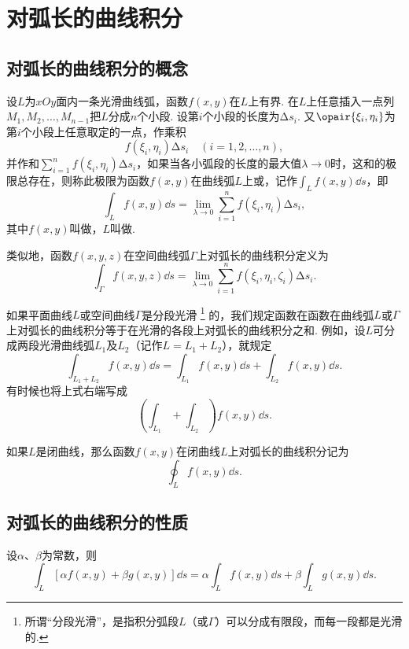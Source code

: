 \section{对弧长的曲线积分}
\subsection{对弧长的曲线积分的概念}
\begin{definition}
设\(L\)为\(xOy\)面内一条光滑曲线弧，函数\(f(x,y)\)在\(L\)上有界.
在\(L\)上任意插入一点列\(M_1,M_2,\dotsc,M_{n-1}\)把\(L\)分成\(n\)个小段.
设第\(i\)个小段的长度为\(\increment s_i\).
又\(\opair{\xi_i,\eta_i}\)为第\(i\)个小段上任意取定的一点，作乘积\[
f(\xi_i,\eta_i) \increment s_i \quad(i=1,2,\dotsc,n),
\]并作和\(\sum\limits_{i=1}^n f(\xi_i,\eta_i) \increment s_i\)，如果当各小弧段的长度的最大值\(\lambda\to0\)时，这和的极限总存在，则称此极限为函数\(f(x,y)\)在曲线弧\(L\)上或，记作\(\int_L f(x,y) \dd{s}\)，即\[
\int_L f(x,y) \dd{s}
= \lim\limits_{\lambda\to0} \sum\limits_{i=1}^n f(\xi_i,\eta_i) \increment s_i,
\]其中\(f(x,y)\)叫做，\(L\)叫做.

类似地，函数\(f(x,y,z)\)在空间曲线弧\(\Gamma\)上对弧长的曲线积分定义为\[
\int_\Gamma f(x,y,z) \dd{s}
=\lim\limits_{\lambda\to0} \sum\limits_{i=1}^n f(\xi_i,\eta_i,\zeta_i) \increment s_i.
\]

如果平面曲线\(L\)或空间曲线\(\Gamma\)是分段光滑%
\footnote{%
所谓“分段光滑”，是指积分弧段\(L\)（或\(\Gamma\)）可以分成有限段，而每一段都是光滑的.%
}%
的，我们规定函数在函数在曲线弧\(L\)或\(\Gamma\)上对弧长的曲线积分等于在光滑的各段上对弧长的曲线积分之和.
例如，设\(L\)可分成两段光滑曲线弧\(L_1\)及\(L_2\)（记作\(L=L_1+L_2\)），就规定
\[
\int_{L_1+L_2} f(x,y) \dd{s}
= \int_{L_1} f(x,y) \dd{s}
+ \int_{L_2} f(x,y) \dd{s}.
\]
有时候也将上式右端写成\[
\left( \int_{L_1} + \int_{L_2} \right) f(x,y) \dd{s}.
\]

如果\(L\)是闭曲线，那么函数\(f(x,y)\)在闭曲线\(L\)上对弧长的曲线积分记为\[
\oint_L f(x,y) \dd{s}.
\]
\end{definition}

\subsection{对弧长的曲线积分的性质}
\begin{property}\label{theorem:线积分与面积分.第一类曲线积分性质1}
设\(\alpha\)、\(\beta\)为常数，则\[
\int_L [\alpha f(x,y) + \beta g(x,y)] \dd{s}
= \alpha \int_L f(x,y) \dd{s}
+ \beta \int_L g(x,y) \dd{s}.
\]
\end{property}

